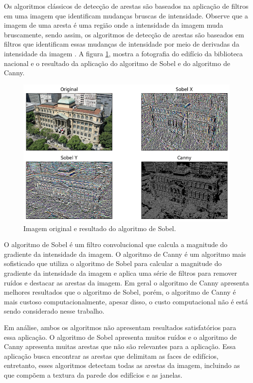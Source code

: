 \documentclass[12pt]{article}
\begin{document}
Os algoritmos clássicos de detecção de arestas são baseados na aplicação de filtros em uma imagem que identificam mudanças bruscas de intensidade. Observe que a imagem de uma aresta é uma região onde a intensidade da imagem muda bruscamente, sendo assim, os algoritmos de detecção de arestas são baseados em filtros que identificam essas mudanças de intensidade por meio de derivadas da intensidade da imagem \cite{shrivakshan2012comparison}. A figura \ref{fig:sobel}, mostra a fotografia do edifício da biblioteca nacional e o resultado da aplicação do algoritmo de Sobel e do algoritmo de Canny.

\begin{figure}[H]
\centering
\includegraphics[scale=0.70]{sobel.png}
\caption{Imagem original e resultado do algoritmo de Sobel.}
\label{fig:sobel}
\end{figure}

O algoritmo de Sobel é um filtro convolucional que calcula a magnitude do gradiente da intensidade da imagem. O algoritmo de Canny é um algoritmo mais sofisticado que utiliza o algoritmo de Sobel para calcular a magnitude do gradiente da intensidade da imagem e aplica uma série de filtros para remover ruídos e destacar as arestas da imagem. Em geral o algoritmo de Canny apresenta melhores resultados que o algoritmo de Sobel, porém, o algoritmo de Canny é mais custoso computacionalmente, apesar disso, o custo computacional não é está sendo considerado nesse trabalho.

Em análise, ambos os algoritmos não apresentam resultados satisfatórios para essa aplicação. O algoritmo de Sobel apresenta muitos ruídos e o algoritmo de Canny apresenta muitas arestas que não são relevantes para a aplicação. Essa aplicação busca encontrar as arestas que delimitam as faces de edifícios, entretanto, esses algoritmos detectam todas as arestas da imagem, incluindo as que compõem a textura da parede dos edifícios e as janelas. 
\end{document}

